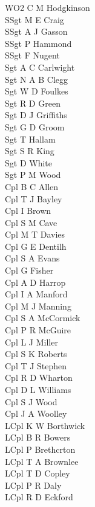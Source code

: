 \begin{multicols}{3}
  \small
  \noindent
  WO2 C M Hodgkinson \\
  SSgt M E Craig \\
  SSgt A J Gasson \\
  SSgt P Hammond \\
  SSgt F Nugent \\
  Sgt A C Carlwight \\
  Sgt N A B Clegg \\
  Sgt W D Foulkes \\
  Sgt R D Green \\
  Sgt D J Griffiths \\
  Sgt G D Groom \\
  Sgt T Hallam \\
  Sgt S R King \\
  Sgt D White \\
  Sgt P M Wood \\
  Cpl B C Allen \\
  Cpl T J Bayley \\
  Cpl I Brown \\
  Cpl S M Cave \\
  Cpl M T Davies \\
  Cpl G E Dentilh \\
  Cpl S A Evans \\
  Cpl G Fisher \\
  Cpl A D Harrop \\
  Cpl I A Manford \\
  Cpl M J Manning \\
  Cpl S A McCormick \\
  Cpl P R McGuire \\
  Cpl L J Miller \\
  Cpl S K Roberts \\
  Cpl T J Stephen \\
  Cpl R D Wharton \\
  Cpl D L Williams \\
  Cpl S J Wood \\
  Cpl J A Woolley \\
  LCpl K W Borthwick \\
  LCpl B R Bowers \\
  LCpl P Brethcrton \\
  LCpl T A Brownlee \\
  LCpl T D Copley \\
  LCpl P R Daly \\
  LCpl R D Eckford \\

\end{multicols}
